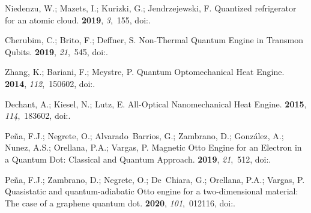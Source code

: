 \documentclass[preprints,article,accept,moreauthors,pdftex]{Definitions/mdpi}
\begin{document}
\begin{thebibliography}{999}
Niedenzu, W.; Mazets, I.; Kurizki, G.; Jendrzejewski, F.
\newblock Quantized refrigerator for an atomic cloud.
 {\bf 2019}, {\em 3},~155,
\newblock
  doi:{\href{https://doi.org/10.22331/q-2019-06-28-155}{}}.

Cherubim, C.; Brito, F.; Deffner, S.
\newblock Non-Thermal Quantum Engine in Transmon Qubits.
 {\bf 2019}, {\em 21},~545,
\newblock
  doi:{\href{https://doi.org/10.3390/e21060545}{}}.

Zhang, K.; Bariani, F.; Meystre, P.
\newblock Quantum Optomechanical Heat Engine.
 {\bf 2014}, {\em 112},~150602,
\newblock
  doi:{\href{https://doi.org/10.1103/PhysRevLett.112.150602}{}}.

Dechant, A.; Kiesel, N.; Lutz, E.
\newblock All-Optical Nanomechanical Heat Engine.
 {\bf 2015}, {\em 114},~183602,
\newblock
  doi:{\href{https://doi.org/10.1103/PhysRevLett.114.183602}{}}.

Pe{\~n}a, F.J.; Negrete, O.; Alvarado~Barrios, G.; Zambrano, D.; González, A.;
  Nunez, A.S.; Orellana, P.A.; Vargas, P.
\newblock Magnetic {Otto} Engine for an Electron in a Quantum Dot: Classical
  and Quantum Approach.
 {\bf 2019}, {\em 21},~512,
\newblock
  doi:{\href{https://doi.org/10.3390/e21050512}{}}.

Pe\~na, F.J.; Zambrano, D.; Negrete, O.; De~Chiara, G.; Orellana, P.A.; Vargas,
  P.
\newblock Quasistatic and quantum-adiabatic Otto engine for a two-dimensional
  material: The case of a graphene quantum dot.
 {\bf 2020}, {\em 101},~012116,
\newblock
  doi:{\href{https://doi.org/10.1103/PhysRevE.101.012116}{}}.


\end{thebibliography}
\end{document}
